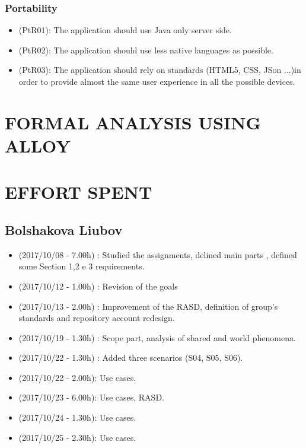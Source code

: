 \documentclass[a4paper,leqno]{book}
\begin{document}
\subsection{Portability}
\begin{itemize}
\item (PtR01): The application should use Java only server side.
\item (PtR02): The application should use less native languages as possible.
\item (PtR03): The application should rely on standards (HTML5, CSS, JSon ...)in order to provide almost the same user experience in all the possible devices.
\end{itemize}

\chapter{FORMAL ANALYSIS USING ALLOY}

\chapter{EFFORT SPENT}

\section{Bolshakova Liubov}
\begin{itemize}
\item (2017/10/08 - 7.00h) : Studied the assignments, delined main parts , defined some Section 1,2 e 3 requirements.
\item (2017/10/12 - 1.00h) : Revision of the goals 
\item (2017/10/13 - 2.00h) : Improvement of the RASD, definition of group's standards and repository account redesign.
\item (2017/10/19 - 1.30h) : Scope part, analysis of shared and world phenomena.
\item (2017/10/22 - 1.30h) : Added three scenarios (S04, S05, S06).
\item (2017/10/22 - 2.00h): Use cases.
\item (2017/10/23 - 6.00h): Use cases, RASD. 
\item (2017/10/24 - 1.30h): Use cases.
\item (2017/10/25 - 2.30h): Use cases.
\end{itemize}
\end{document}
